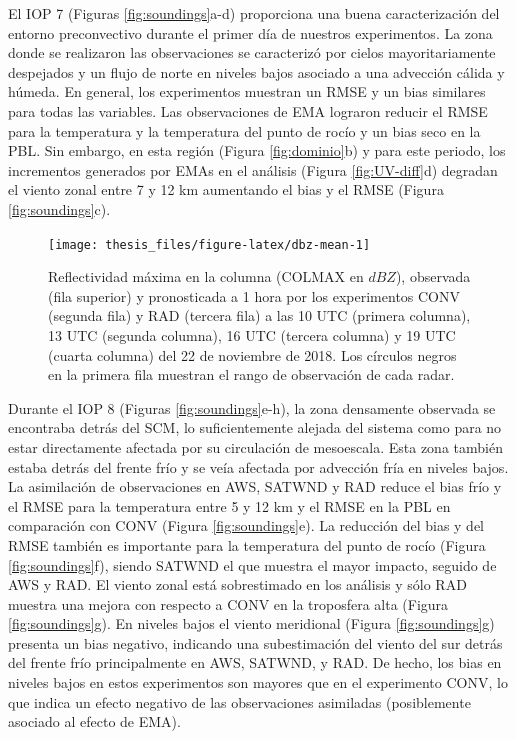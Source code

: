 \documentclass[12pt,oneside,a4paper]{reedthesis}
\begin{document}
El IOP 7 (Figuras \ref{fig:soundings}a-d) proporciona una buena caracterización del entorno preconvectivo durante el primer día de nuestros experimentos. La zona donde se realizaron las observaciones se caracterizó por cielos mayoritariamente despejados y un flujo de norte en niveles bajos asociado a una advección cálida y húmeda. En general, los experimentos muestran un RMSE y un bias similares para todas las variables. Las observaciones de EMA lograron reducir el RMSE para la temperatura y la temperatura del punto de rocío y un bias seco en la PBL. Sin embargo, en esta región (Figura \ref{fig:dominio}b) y para este periodo, los incrementos generados por EMAs en el análisis (Figura \ref{fig:UV-diff}d) degradan el viento zonal entre 7 y 12 km aumentando el bias y el RMSE (Figura \ref{fig:soundings}c).


\begin{figure}
\texttt{[image: thesis\_files/figure-latex/dbz-mean-1]} \caption{Reflectividad máxima en la columna (COLMAX en \(dBZ\)), observada (fila superior) y pronosticada a 1 hora por los experimentos CONV (segunda fila) y RAD (tercera fila) a las 10 UTC (primera columna), 13 UTC (segunda columna), 16 UTC (tercera columna) y 19 UTC (cuarta columna) del 22 de noviembre de 2018. Los círculos negros en la primera fila muestran el rango de observación de cada radar.}\label{fig:dbz-mean}
\end{figure}
Durante el IOP 8 (Figuras \ref{fig:soundings}e-h), la zona densamente observada se encontraba detrás del SCM, lo suficientemente alejada del sistema como para no estar directamente afectada por su circulación de mesoescala. Esta zona también estaba detrás del frente frío y se veía afectada por advección fría en niveles bajos. La asimilación de observaciones en AWS, SATWND y RAD reduce el bias frío y el RMSE para la temperatura entre 5 y 12 km y el RMSE en la PBL en comparación con CONV (Figura \ref{fig:soundings}e). La reducción del bias y del RMSE también es importante para la temperatura del punto de rocío (Figura \ref{fig:soundings}f), siendo SATWND el que muestra el mayor impacto, seguido de AWS y RAD. El viento zonal está sobrestimado en los análisis y sólo RAD muestra una mejora con respecto a CONV en la troposfera alta (Figura \ref{fig:soundings}g). En niveles bajos el viento meridional (Figura \ref{fig:soundings}g) presenta un bias negativo, indicando una subestimación del viento del sur detrás del frente frío principalmente en AWS, SATWND, y RAD. De hecho, los bias en niveles bajos en estos experimentos son mayores que en el experimento CONV, lo que indica un efecto negativo de las observaciones asimiladas (posiblemente asociado al efecto de EMA).
\end{document}
